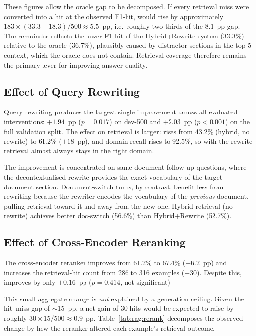 These figures allow the oracle gap to be decomposed. If every retrieval miss were
converted into a hit at the observed F1-hit, \fone{} would rise by approximately
$183 \times (33.3 - 18.3) / 500 \approx 5.5$~pp, i.e.\ roughly two thirds of the
8.1~pp gap. The remainder reflects the lower F1-hit of the Hybrid+Rewrite system
(33.3\%) relative to the oracle (36.7\%), plausibly caused by distractor
sections in the top-5 context, which the oracle does not contain. Retrieval
coverage therefore remains the primary lever for improving answer quality.

\subsection{Effect of Query Rewriting}

Query rewriting produces the largest single improvement across all evaluated
interventions: $+1.94$~pp \fone{} ($p = 0.017$) on dev-500 and $+2.03$~pp
($p < 0.001$) on the full validation split. The effect on retrieval is larger: 
rises from 43.2\% (hybrid, no rewrite) to 61.2\% ($+18$~pp), and domain recall rises to
92.5\%, so with the rewrite retrieval almost always stays in the right domain.

The improvement is concentrated on same-document follow-up questions, where the
decontextualised rewrite provides the exact vocabulary of the target document
section. Document-switch turns, by contrast, benefit less from rewriting because
the rewriter encodes the vocabulary of the \emph{previous} document, pulling
retrieval toward it and away from the new one. Hybrid retrieval (no rewrite)
achieves better doc-switch  (56.6\%) than Hybrid+Rewrite (52.7\%).

\subsection{Effect of Cross-Encoder Reranking}

The cross-encoder reranker improves  from 61.2\% to 67.4\% ($+6.2$~pp) and
increases the retrieval-hit count from 286 to 316 examples ($+30$). Despite this,
\fone{} improves by only $+0.16$~pp ($p = 0.414$, not significant).

This small aggregate change is \emph{not} explained by a generation ceiling. Given
the hit--miss gap of $\sim$15~pp, a net gain of 30 hits would be expected to raise
\fone{} by roughly $30 \times 15 / 500 \approx 0.9$~pp. Table~\ref{tab:rag:rerank}
decomposes the observed change by how the reranker altered each example's
retrieval outcome.

